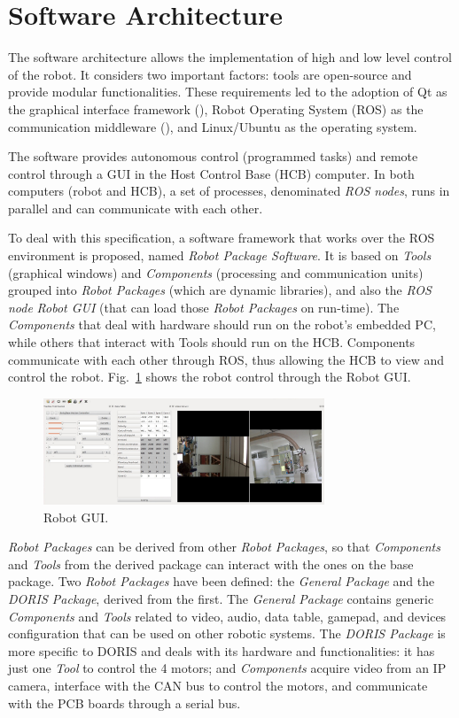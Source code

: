 \documentclass{ifacconf}
\begin{document}
\section{Software Architecture}\label{sec:software}
The software architecture allows the implementation of high and low level
control of the robot. It considers two important factors: tools are open-source
and provide modular functionalities. These requirements led to the adoption of
Qt as the graphical interface framework (\cite{qt}), Robot Operating System
(ROS) as the communication middleware (\cite{ros}), and Linux/Ubuntu as the
operating system.

The software provides autonomous control (programmed tasks) and remote control
through a GUI in the Host Control Base (HCB) computer. In both computers (robot
and HCB), a set of processes, denominated \emph{ROS nodes}, runs in parallel and
can communicate with each other.

To deal with this specification, a software framework that works over the ROS
environment is proposed, named \emph{Robot Package Software}. It is based on
\emph{Tools} (graphical windows) and \emph{Components} (processing and
communication units) grouped into \emph{Robot Packages} (which are dynamic
libraries), and also the \emph{ROS node} \emph{Robot GUI} (that can load those
\emph{Robot Packages} on run-time). The \emph{Components} that deal with
hardware should run on the robot's embedded PC, while others that interact with
Tools should run on the HCB. Components communicate with each other through
ROS, thus allowing the HCB to view and control the robot.
Fig.~\ref{fig:robotgui} shows the robot control through the Robot GUI.

\begin{figure} 
\centering
\includegraphics[width=8.4cm]{figs/robotgui2.jpg}
\caption{Robot GUI.}
\label{fig:robotgui}
\end{figure}

\emph{Robot Packages} can be derived from other \emph{Robot Packages}, so that
\emph{Components} and \emph{Tools} from the derived package can interact with
the ones on the base package. Two \emph{Robot Packages} have been defined: the
\emph{General Package} and the \emph{DORIS Package}, derived from the first. The
\emph{General Package} contains generic \emph{Components} and \emph{Tools}
related to video, audio, data table, gamepad, and devices configuration that can
be used on other robotic systems. The \emph{DORIS Package} is more specific to
DORIS and deals with its hardware and functionalities: it has just one
\emph{Tool} to control the 4 motors; and \emph{Components} acquire video from
an IP camera, interface with the CAN bus to control the motors, and communicate
with the PCB boards through a serial bus.
\end{document}
